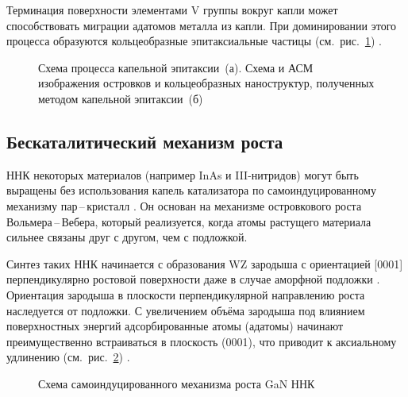 Терминация поверхности элементами V группы вокруг капли может способствовать
миграции адатомов металла из капли. При доминировании этого процесса образуются
кольцеобразные эпитаксиальные частицы (см.~рис.~\cref{fig:Image_8_3})
\cite{Gurioli2019, mano2005}.

\begin{figure}[ht]  \caption{Схема
		процесса капельной эпитаксии~(а). Схема и АСМ изображения островков и
		кольцеобразных наноструктур, полученных методом капельной эпитаксии~(б)
\cite{Gurioli2019}}\label{fig:Image_8_3} \end{figure}

\subsection{Бескаталитический механизм роста}\label{subsec:ch1/sec2/sub7}

ННК некоторых материалов (например InAs и III-нитридов) могут быть выращены без
использования капель катализатора по самоиндуцированному механизму
пар\,--\,кристалл \cite{Ristic2008, Bolshakov2014}. Он основан на механизме
островкового роста Вольмера\,--\,Вебера, который реализуется, когда атомы
растущего материала сильнее связаны друг с другом, чем с подложкой.

Синтез таких ННК начинается с образования WZ зародыша с ориентацией [0001]
перпендикулярно ростовой поверхности даже в случае аморфной подложки
\cite{Stoica2008, Corfdir2009}. Ориентация зародыша в плоскости
перпендикулярной направлению роста наследуется от подложки. С увеличением
объёма зародыша под влиянием поверхностных энергий адсорбированные атомы
(адатомы) начинают преимущественно встраиваться в плоскость (0001), что
приводит к аксиальному удлинению (см.~рис.~\cref{fig:Image_9})
\cite{Dubrovskii2012b}.

\begin{figure}[ht]  \caption{Схема самоиндуцированного механизма роста GaN ННК
\cite{Dubrovskii2012b}}\label{fig:Image_9} \end{figure}

\FloatBarrier
